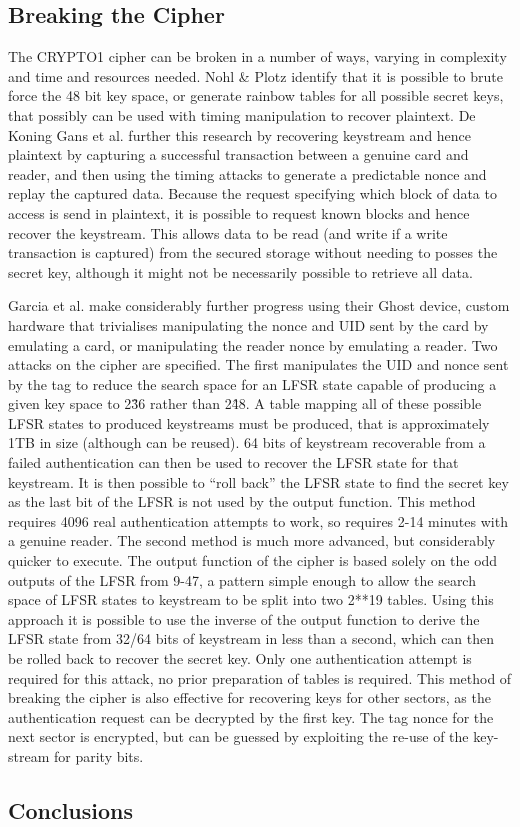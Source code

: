 \documentclass[pdflatex, a4paper,12pt]{article}
\begin{document}
\subsection{Breaking the Cipher}

The CRYPTO1 cipher can be broken in a number of ways, varying in complexity and
time and resources needed. Nohl \& Plotz identify that it is possible to brute
force the 48 bit key space, or generate rainbow tables for all possible secret
keys, that possibly can be used with timing manipulation to recover plaintext.
De Koning Gans et al. further this research by recovering keystream and hence
plaintext by capturing a successful transaction between a genuine card and
reader, and then using the timing attacks to generate a predictable nonce and
replay the captured data\cite{gans_practical_2008}. Because the request
specifying which block of data to
access is send in plaintext, it is possible to request known blocks and hence
recover the keystream. This allows data to be read (and write if a write
transaction is captured) from the secured storage without needing to posses the
secret key, although it might not be necessarily possible to retrieve all data.

Garcia et al. make considerably further progress using their Ghost device,
custom hardware that trivialises manipulating the nonce and UID sent by the card
by emulating a card, or manipulating the reader nonce by emulating a reader. Two
attacks on the cipher are specified. The first manipulates the UID and nonce
sent by the tag to reduce the search space for an LFSR state capable of
producing a given key space to 2\^36 rather than 2\^48. A table mapping all of
these possible LFSR states to produced keystreams must be produced, that is
approximately 1TB in size (although can be reused). 64 bits of keystream
recoverable from a failed authentication can then be used to recover the LFSR
state for that keystream. It is then possible to ``roll back'' the LFSR state to
find the secret key as the last bit of the LFSR is not used by the output
function. This method requires 4096 real authentication attempts to work, so
requires 2-14 minutes with a genuine reader. The second method is much more
advanced, but considerably quicker to execute. The output function of the cipher
is based solely on the odd outputs of the LFSR from 9-47, a pattern simple
enough to allow the search space of LFSR states to keystream to be split into
two 2**19 tables. Using this approach it is possible to use the inverse of the output
function to derive the LFSR state from 32/64 bits of keystream in less than a
second, which can then be rolled back to recover the secret key. Only one
authentication attempt is required for this attack, no prior preparation of
tables is required. This method of breaking the cipher is also effective for
recovering keys for other sectors, as the authentication request can be
decrypted by the first key. The tag nonce for the next sector is encrypted, but
can be guessed by exploiting the re-use of the key-stream for parity bits. 

\subsection{Conclusions}


{}
\end{document}
